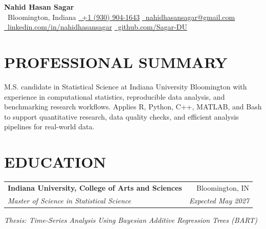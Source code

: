 \documentclass[10pt,letterpaper]{article}
\makeatletter
\newcommand{\resumeEntry}[4]{%
  \begin{tabularx}{\textwidth}{@{}Xr@{}}
    \textbf{#1} & #2 \\
    \textit{#3} & \textit{#4}
  \end{tabularx}%
}
\newcommand{\contactsep}{\qquad}
\makeatother
\begin{document}
\normalsize

\begin{center}
  {\LARGE
   \textbf{Nahid Hasan Sagar}}\\[2.2pt]

  {\footnotesize
    \faMapMarker*\, Bloomington, Indiana
    \contactsep
    \href{tel:+19309041643}{\faPhone*\, +1 (930) 904-1643}
    \contactsep
    \href{mailto:nahidhasansagar@gmail.com}{\faEnvelope\, nahidhasansagar@gmail.com}
  }\\[-0.2pt]

  {\footnotesize
    \href{https://www.linkedin.com/in/nahidhasansagar/}{\faLinkedinIn\, linkedin.com/in/nahidhasansagar}
    \contactsep
    \href{https://github.com/Sagar-DU}{\faGithub\, github.com/Sagar-DU}
  }
\end{center}

\vspace{-5pt}

\section*{PROFESSIONAL SUMMARY}

M.S. candidate in Statistical Science at Indiana University Bloomington with experience in computational statistics, reproducible data analysis, and benchmarking research workflows. Applies R, Python, C++, MATLAB, and Bash to support quantitative research, data quality checks, and efficient analysis pipelines for real-world data.

\section*{EDUCATION}

\resumeEntry
  {Indiana University, College of Arts and Sciences}
  {Bloomington, IN}
  {Master of Science in Statistical Science}
  {Expected May 2027}

\vspace{0.4pt}

\textit{Thesis: Time-Series Analysis Using Bayesian Additive Regression Trees (BART)}
\end{document}
